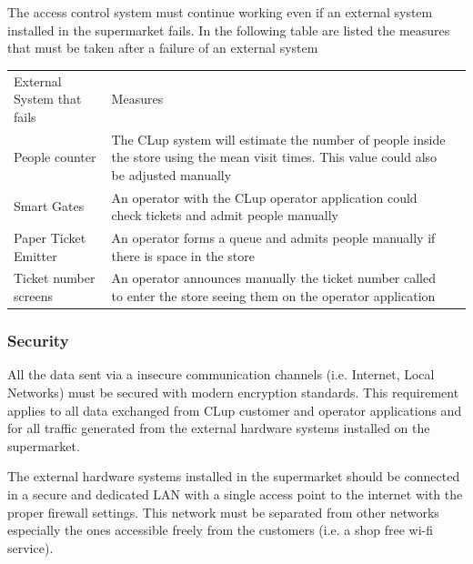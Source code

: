 \smallskip

The access control system must continue working even if an external system installed in the supermarket fails. In the following table are listed the measures that must be taken after a failure of an external system
\smallskip

\begin{tabular}{C{5cm}L{10.0cm}C{2.0cm}}
    External System that fails & Measures                                                                                                                                   \\
    People counter             & The CLup system will estimate the number of people inside the store using the mean visit times. This value could also be adjusted manually \\
    Smart Gates                & An operator with the CLup operator application could check tickets and admit people manually                                               \\
    Paper Ticket Emitter       & An operator forms a queue and admits people manually if there is space in the store                                                        \\
    Ticket number screens      & An operator announces manually the ticket number called to enter the store seeing them on the operator application                         \\
\end{tabular}
\subsubsection{Security}
All the data sent via a insecure communication channels (i.e. Internet, Local Networks) must be secured with modern encryption standards. This requirement applies to all data exchanged from CLup customer and operator applications and for all traffic generated from the external hardware systems installed on the supermarket.

\smallskip

The external hardware systems installed in the supermarket should be connected in a secure and dedicated LAN with a single access point to the internet with the proper firewall settings. This network must be separated from other networks especially the ones accessible freely from the customers (i.e. a shop free wi-fi service).

\smallskip

